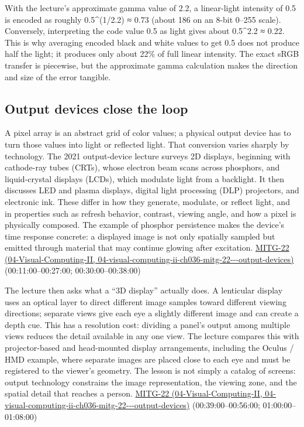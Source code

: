 With the lecture's approximate gamma value of 2.2, a linear-light intensity of 0.5 is encoded as roughly 0.5\^{}(1/2.2) ≈ 0.73 (about 186 on an 8-bit 0--255 scale). Conversely, interpreting the code value 0.5 as light gives about 0.5\^{}2.2 ≈ 0.22. This is why averaging encoded black and white values to get 0.5 does not produce half the light; it produces only about 22\% of full linear intensity. The exact sRGB transfer is piecewise, but the approximate gamma calculation makes the direction and size of the error tangible.

\subsection{Output devices close the loop}\label{03-visual-computing-i-ch004-output-devices-close-the-loop}

A pixel array is an abstract grid of color values; a physical output device has to turn those values into light or reflected light. That conversion varies sharply by technology. The 2021 output-device lecture surveys 2D displays, beginning with cathode-ray tubes (CRTs), whose electron beam scans across phosphors, and liquid-crystal displays (LCDs), which modulate light from a backlight. It then discusses LED and plasma displays, digital light processing (DLP) projectors, and electronic ink. These differ in how they generate, modulate, or reflect light, and in properties such as refresh behavior, contrast, viewing angle, and how a pixel is physically composed. The example of phosphor persistence makes the device's time response concrete: a displayed image is not only spatially sampled but emitted through material that may continue glowing after excitation. \href{../04-Visual-Computing-II/main.pdf\#nameddest=04-visual-computing-ii-ch036-mitg-22---output-devices}{MITG-22 (04-Visual-Computing-II, 04-visual-computing-ii-ch036-mitg-22-\/-\/-output-devices)} (00:11:00--00:27:00; 00:30:00--00:38:00)

The lecture then asks what a ``3D display'' actually does. A lenticular display uses an optical layer to direct different image samples toward different viewing directions; separate views give each eye a slightly different image and can create a depth cue. This has a resolution cost: dividing a panel's output among multiple views reduces the detail available in any one view. The lecture compares this with projector-based and head-mounted display arrangements, including the Oculus / HMD example, where separate images are placed close to each eye and must be registered to the viewer's geometry. The lesson is not simply a catalog of screens: output technology constrains the image representation, the viewing zone, and the spatial detail that reaches a person. \href{../04-Visual-Computing-II/main.pdf\#nameddest=04-visual-computing-ii-ch036-mitg-22---output-devices}{MITG-22 (04-Visual-Computing-II, 04-visual-computing-ii-ch036-mitg-22-\/-\/-output-devices)} (00:39:00--00:56:00; 01:00:00--01:08:00)

